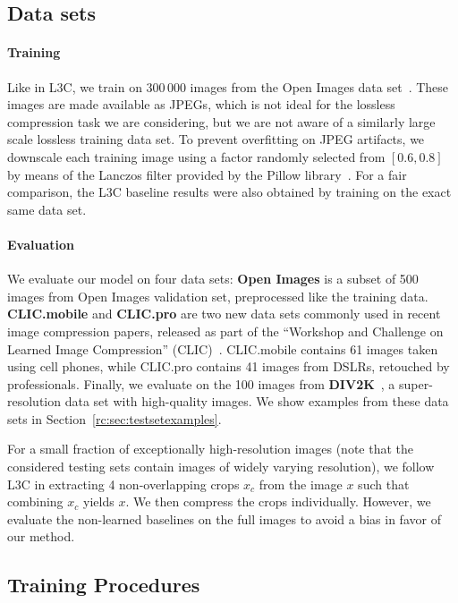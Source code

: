 \subsection{Data sets} \label{rc:sec:datasets}

\paragraph{Training}
Like in L3C, we train on $300\,000$ images from the Open Images data set~\cite{OpenImages}. These images are made available as JPEGs, which is not ideal for the lossless compression task we are considering, but we are not aware of a similarly large scale lossless training data set. To prevent overfitting on JPEG artifacts, we downscale each training image using a factor randomly selected from $[0.6, 0.8]$ by means of the Lanczos filter provided by the Pillow library~\cite{pillowurl}.
For a fair comparison, the L3C baseline results were also obtained by training on the exact same data set. 


\paragraph{Evaluation}
We evaluate our model on four data sets: \textbf{Open Images} is a subset of 500 images from Open Images validation set, preprocessed like the training data. \textbf{CLIC.mobile} and \textbf{CLIC.pro} are two new data sets
commonly used in recent image compression papers,
released as part of the ``Workshop and Challenge on Learned Image Compression'' (CLIC)~\cite{clic2020}.
CLIC.mobile contains 61 images taken using cell phones, while CLIC.pro contains 41 images from DSLRs, retouched by professionals.
Finally, we evaluate on the 100 images from \textbf{DIV2K}~\cite{agustssondiv2k}, a super-resolution data set with high-quality images. We show examples from these data sets in Section~\ref{rc:sec:testsetexamples}.

For a small fraction of exceptionally high-resolution images (note that the considered testing sets contain images of widely varying resolution), we follow L3C in extracting 4 non-overlapping crops $x_c$ from the image $x$ such that combining $x_c$ yields $x$. We then compress the crops individually.
However, we evaluate the non-learned baselines on the full images to avoid a bias in favor of our method.


\subsection{Training Procedures}
\label{rc:sec:trainingproc}

